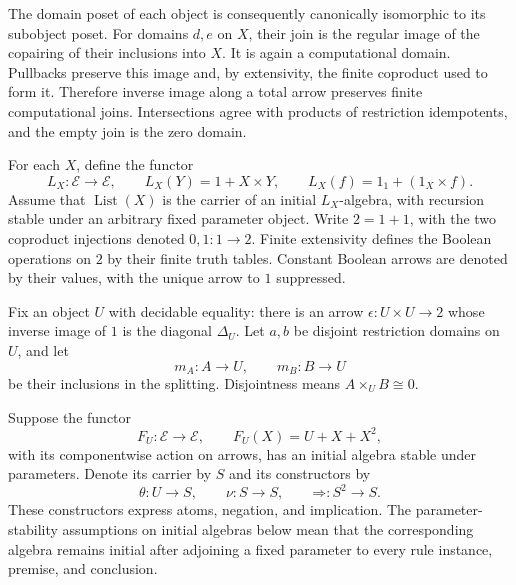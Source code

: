 \documentclass[11pt]{article}
\theoremstyle{definition}
\theoremstyle{remark}
\begin{document}
The domain poset of each object is consequently canonically isomorphic
to its subobject poset.
For domains $d,e$ on $X$, their join is the regular image of the
copairing of their inclusions into $X$. It is again a computational
domain. Pullbacks preserve this image and, by extensivity, the finite
coproduct used to form it. Therefore inverse image along a total arrow
preserves finite computational joins. Intersections agree with products
of restriction idempotents, and the empty join is the zero domain.

For each $X$, define the functor
\[
 L_X:\mathscr E\longrightarrow\mathscr E,
 \qquad L_X(Y)=1+X\times Y,\qquad
 L_X(f)=1_1+(1_X\times f).
\]
Assume that $\operatorname{List}(X)$ is the carrier of an initial
$L_X$-algebra, with recursion stable under an arbitrary fixed parameter
object. Write $2=1+1$, with the two
coproduct injections denoted $0,1:1\to2$. Finite extensivity defines
the Boolean operations on $2$ by their finite truth tables. Constant
Boolean arrows are denoted by their values, with the unique arrow to
$1$ suppressed.

Fix an object $U$ with decidable equality: there is an arrow
$\epsilon:U\times U\to2$ whose inverse image of $1$ is the diagonal
$\Delta_U$. Let $a,b$ be disjoint restriction domains on $U$, and let
\[
 m_A:A\longrightarrow U,\qquad m_B:B\longrightarrow U
\]
be their inclusions in the splitting. Disjointness means
$A\times_U B\cong0$.

Suppose the functor
\[
 F_U:\mathscr E\longrightarrow\mathscr E,
 \qquad F_U(X)=U+X+X^2,
\]
with its componentwise action on arrows, has an initial algebra stable
under parameters. Denote its carrier by $S$ and its constructors by
\[
 \theta:U\to S,\qquad \nu:S\to S,
 \qquad \mathbin{\Rightarrow}:S^2\to S.
\]
These constructors express atoms, negation, and implication. The
parameter-stability assumptions on initial algebras below mean that the
corresponding algebra remains initial after adjoining a fixed parameter
to every rule instance, premise, and conclusion.
\end{document}
